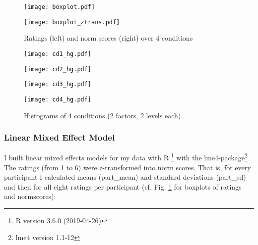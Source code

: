 \documentclass[output=paper,
modfonts
]{langscibook}
\begin{document}
\begin{figure}[H]
    \centering
    \begin{minipage}{0.495\textwidth}
        \texttt{[image: boxplot.pdf]}
    \end{minipage}
    \begin{minipage}{0.495\textwidth}
        \texttt{[image: boxplot\_ztrans.pdf]}
        \caption{Ratings (left) and norm scores (right) over 4 conditions}
        \label{fig:boxplots}
    \end{minipage}
\end{figure}

\begin{figure}[H]
    \centering
    \begin{minipage}{0.495\textwidth}
        \texttt{[image: cd1\_hg.pdf]}
    \end{minipage}
    \begin{minipage}{0.495\textwidth}
        \texttt{[image: cd2\_hg.pdf]}
    \end{minipage}

    \begin{minipage}{0.495\textwidth}
        \texttt{[image: cd3\_hg.pdf]}
    \end{minipage}
    \begin{minipage}{0.495\textwidth}
        \texttt{[image: cd4\_hg.pdf]}
        \caption{Histograms of 4 conditions (2 factors, 2 levels each)}
        \label{fig:histograms}
    \end{minipage}
\end{figure}

\subsubsection{Linear Mixed Effect Model}

I built linear mixed effects models for my data with R \citep{r_software}\footnote{R version 3.6.0 (2019-04-26)} with the lme4-package\footnote{ lme4 version 1.1-12} \citep{lme4}. The ratings (from 1 to 6) were z-transformed into norm scores. That is, for every participant I calculated means (part\_mean) and standard deviations (part\_sd) and then for all eight ratings per participant (cf. Fig. \ref{fig:boxplots} for boxplots of ratings and normscores):
\end{document}
